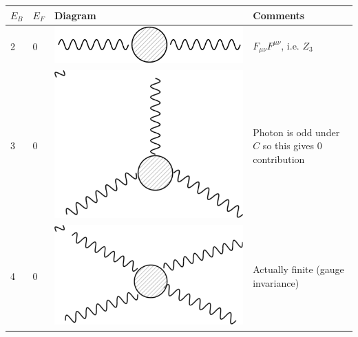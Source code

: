 \documentclass[a4paper,12pt]{article}
\begin{document}
\begin{table}[h!]
\begin{tabular}{llll}
$E_B$ & $E_F$ & Diagram                                                 & Comments                                                                                              \\
\hline
2     & 0     & \includegraphics[scale=0.2]{figs/pc1.pdf} & $F_{\mu\nu}F^{\mu\nu}$, i.e. $Z_3$                                                                         \\
3     & 0     & \includegraphics[scale=0.2]{figs/pc2.pdf}  & Photon is odd under $C$ so this gives 0 contribution                                                    \\ 
4     & 0     &  \includegraphics[scale=0.2]{figs/pc3.pdf}    & Actually finite (gauge invariance)                                                                    \\ 

\end{tabular}
\end{table}
\end{document}
